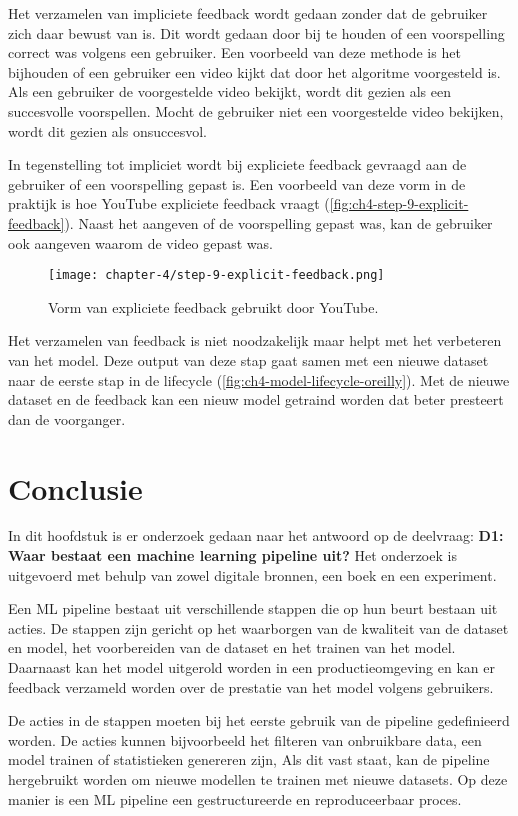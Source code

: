 Het verzamelen van impliciete feedback wordt gedaan zonder dat de gebruiker zich daar bewust van is. Dit wordt gedaan door bij te houden of een voorspelling correct was volgens een gebruiker. Een voorbeeld van deze methode is het bijhouden of een gebruiker een video kijkt dat door het algoritme voorgesteld is. Als een gebruiker de voorgestelde video bekijkt, wordt dit gezien als een succesvolle voorspellen. Mocht de gebruiker niet een voorgestelde video bekijken, wordt dit gezien als onsuccesvol.

In tegenstelling tot impliciet wordt bij expliciete feedback gevraagd aan de gebruiker of een voorspelling gepast is. Een voorbeeld van deze vorm in de praktijk is hoe YouTube expliciete feedback vraagt (\autoref{fig:ch4-step-9-explicit-feedback}). Naast het aangeven of de voorspelling gepast was, kan de gebruiker ook aangeven waarom de video gepast was.

\begin{figure}[hbt!]
  \centering
  \texttt{[image: chapter-4/step-9-explicit-feedback.png]}
  \caption{Vorm van expliciete feedback gebruikt door YouTube.}
  \label{fig:ch4-step-9-explicit-feedback}
\end{figure}

Het verzamelen van feedback is niet noodzakelijk maar helpt met het verbeteren van het model. Deze output van deze stap gaat samen met een nieuwe dataset naar de eerste stap in de lifecycle (\autoref{fig:ch4-model-lifecycle-oreilly}). Met de nieuwe dataset en de feedback kan een nieuw model getraind worden dat beter presteert dan de voorganger.

\section{Conclusie}\label{sec:ch4-conclusie}
In dit hoofdstuk is er onderzoek gedaan naar het antwoord op de deelvraag: \textbf{D1: Waar bestaat een machine learning pipeline uit?} Het onderzoek is uitgevoerd met behulp van zowel digitale bronnen, een boek en een experiment.

Een ML pipeline bestaat uit verschillende stappen die op hun beurt bestaan uit acties. De stappen zijn gericht op het waarborgen van de kwaliteit van de dataset en model, het voorbereiden van de dataset en het trainen van het model. Daarnaast kan het model uitgerold worden in een productieomgeving en kan er feedback verzameld worden over de prestatie van het model volgens gebruikers.

De acties in de stappen moeten bij het eerste gebruik van de pipeline gedefinieerd worden. De acties kunnen bijvoorbeeld het filteren van onbruikbare data, een model trainen of statistieken genereren zijn, Als dit vast staat, kan de pipeline hergebruikt worden om nieuwe modellen te trainen met nieuwe datasets. Op deze manier is een ML pipeline een gestructureerde en reproduceerbaar proces.

